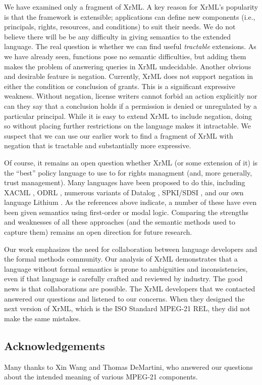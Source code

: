 \documentclass{acmtrans2m}
\newcommand{\<}{
}
\renewcommand{\>}{\rangle}
\begin{document}
We have examined only a fragment of XrML.  A key reason for XrML's popularity is that the framework
is extensible; applications can define new components (i.e., principals, rights, resources, and
conditions) to suit their needs.  We do not believe there will be be any difficulty in giving
semantics to the extended language.  The real question is whether we can find useful {\em tractable\/}
extensions.  As we have already seen, functions pose no semantic difficulties, but adding them makes
the problem of answering queries in XrML undecidable.  Another obvious and desirable feature is
negation.  Currently, XrML does not support negation in either the condition or conclusion of grants.
This is a significant expressive weakness.  Without negation, license writers cannot forbid an action
explicitly nor can they say that a conclusion holds if a permission is denied or unregulated by a
particular principal.  While it is easy to extend XrML to include negation, doing so without placing
further restrictions on the language makes it intractable.  We suspect
that we can use our earlier
work \cite{HW03} to find a fragment of XrML with negation that is tractable and substantially more
expressive.

Of course, it remains an open question whether XrML (or some extension
of it) is the ``best'' policy language to use to for rights managment
(and, more generally, trust management).  Many
languages have been proposed to do this, including XACML \cite{XACML},
ODRL \cite{ODRL}, numerous variants of Datalog
\cite{DeT,LGF03,LMW,MS04,Tre}, SPKI/SDSI \cite{HM01a,LM06,spki1,spki2},
and our own language Lithium \cite{HW03}.
As the references above indicate, a number of these have even been given
semantics using first-order or modal logic.
Comparing the strengths and weaknesses of all these approaches (and the
semantic methods used to capture them) remains an open direction for
future research.

Our work emphasizes the need for collaboration
between language developers and
the formal methods community.  Our analysis of XrML demonstrates that a
language without formal semantics is prone to ambiguities and inconsistencies, even if
that language is carefully crafted and reviewed by industry.  The good news is that collaborations
are possible.  The XrML developers that we contacted answered our questions and listened to our
concerns.  When they designed the next version of XrML, which is the ISO Standard MPEG-21 REL,
they did not make the same mistakes.

\subsection*{Acknowledgements}
Many thanks to Xin Wang and Thomas DeMartini, who answered our questions about the intended meaning
of various MPEG-21 components.
\end{document}

